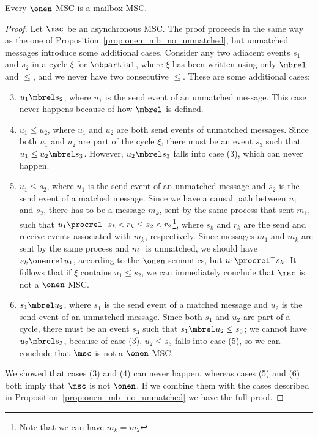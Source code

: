 \begin{proposition}%
	Every $\onen$ MSC is a mailbox MSC.
\end{proposition}
\begin{proof}
Let $\msc$ be an asynchronous MSC. The proof proceeds in the same way as the one of Proposition~\ref{prop:onen_mb_no_unmatched}, but unmatched messages introduce some additional cases. Consider any two adiacent events $s_1$ and $s_2$ in a cycle $\xi$ for $\mbpartial$, where $\xi$ has been written using only $\mbrel$ and $\le$, and we never have two consecutive $\le$. These are some additional cases:
\begin{enumerate}\setcounter{enumi}{2}
	\item $u_1 \mbrel s_2$, where $u_1$ is the send event of an unmatched message. This case never happens because of how $\mbrel$ is defined.
	\item $u_1 \le u_2$, where $u_1$ and $u_2$ are both send events of unmatched messages. Since both $u_1$ and $u_2$ are part of the cycle $\xi$, there must be an event $s_3$ such that $u_1 \le u_2 \mbrel s_3$. However, $u_2 \mbrel s_3$ falls into case (3), which can never happen.
	\item $u_1 \le s_2$, where $u_1$ is the send event of an unmatched message and $s_2$ is the send event of a matched message. Since we have a causal path between $u_1$ and $s_2$, there has to be a message $m_k$, sent by the same process that sent $m_1$, such that $u_1 \procrel^+ s_k \lhd r_k \le s_2 \lhd r_2$\footnote{Note that we can have $m_k = m_2$}, where $s_k$ and $r_k$ are the send and receive events associated with $m_k$, respectively. Since messages $m_1$ and $m_k$ are sent by the same process and $m_1$ is unmatched, we should have $s_k \onenrel u_1$, according to the $\onen$ semantics, but $u_1 \procrel^+ s_k$. It follows that if $\xi$ contains $u_1 \le s_2$, we can immediately conclude that $\msc$ is not a $\onen$ MSC.
	\item $s_1 \mbrel u_2$,  where $s_1$ is the send event of a matched message and $u_2$ is the send event of an unmatched message. Since both $s_1$ and $u_2$ are part of a cycle, there must be an event $s_3$ such that $s_1 \mbrel u_2 \le s_3$; we cannot have $u_2 \mbrel s_3$, because of case (3). $u_2 \le s_3$ falls into case (5), so we can conclude that $\msc$ is not a $\onen$ MSC.
\end{enumerate}
We showed that cases (3) and (4) can never happen, whereas cases (5) and (6) both imply that $\msc$ is not $\onen$. If we combine them with the cases described in Proposition~\ref{prop:onen_mb_no_unmatched} we have the full proof.
\end{proof}

